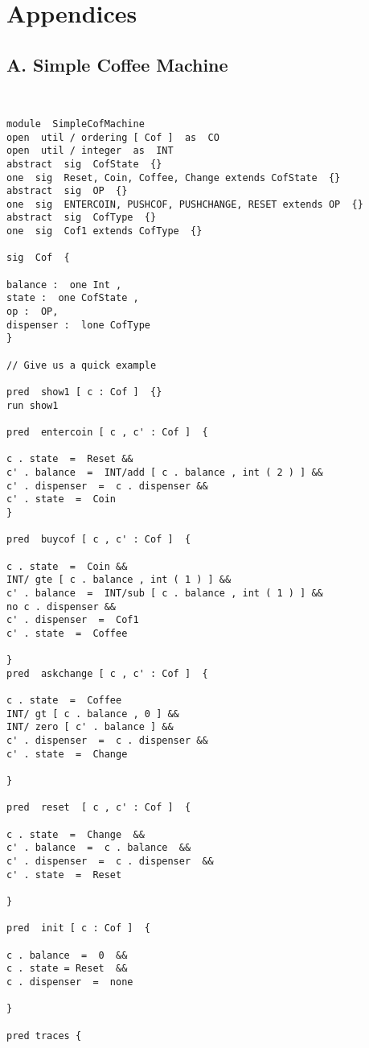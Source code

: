 \documentclass[a4paper,12pt]{extarticle}
\begin{document}
\newpage
\section{Appendices}
\label{Appendices}
\subsection{A. Simple Coffee Machine}


\begin{verbatim}


module  SimpleCofMachine
open  util / ordering [ Cof ]  as  CO
open  util / integer  as  INT
abstract  sig  CofState  {}
one  sig  Reset, Coin, Coffee, Change extends CofState  {}
abstract  sig  OP  {}
one  sig  ENTERCOIN, PUSHCOF, PUSHCHANGE, RESET extends OP  {}
abstract  sig  CofType  {}
one  sig  Cof1 extends CofType  {}

sig  Cof  {

balance :  one Int ,
state :  one CofState ,
op :  OP,
dispenser :  lone CofType
}

// Give us a quick example

pred  show1 [ c : Cof ]  {}
run show1

pred  entercoin [ c , c' : Cof ]  {

c . state  =  Reset &&
c' . balance  =  INT/add [ c . balance , int ( 2 ) ] &&
c' . dispenser  =  c . dispenser &&
c' . state  =  Coin
}

pred  buycof [ c , c' : Cof ]  {

c . state  =  Coin &&
INT/ gte [ c . balance , int ( 1 ) ] &&
c' . balance  =  INT/sub [ c . balance , int ( 1 ) ] &&
no c . dispenser &&
c' . dispenser  =  Cof1
c' . state  =  Coffee

}
pred  askchange [ c , c' : Cof ]  {

c . state  =  Coffee
INT/ gt [ c . balance , 0 ] &&
INT/ zero [ c' . balance ] &&
c' . dispenser  =  c . dispenser &&
c' . state  =  Change

}

pred  reset  [ c , c' : Cof ]  {

c . state  =  Change  &&
c' . balance  =  c . balance  &&
c' . dispenser  =  c . dispenser  &&
c' . state  =  Reset

}

pred  init [ c : Cof ]  {

c . balance  =  0  &&
c . state = Reset  &&
c . dispenser  =  none

}

pred traces {


\end{verbatim}
\end{document}
